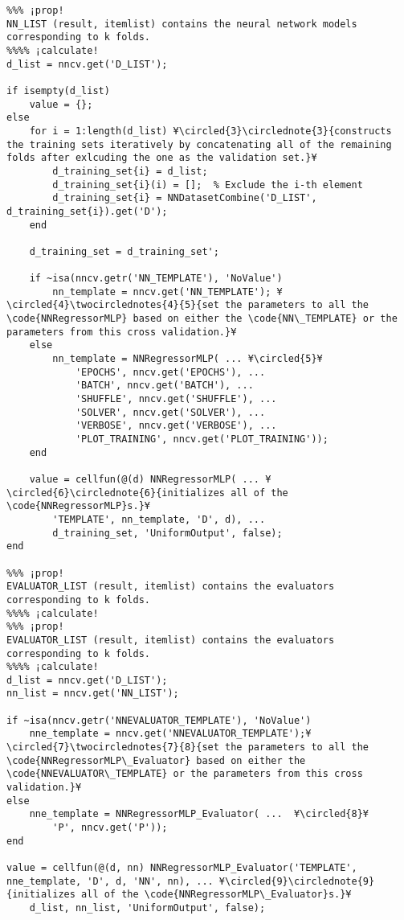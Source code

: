 \documentclass{tufte-handout}
\begin{document}
\begin{lstlisting}
%%% ¡prop!
NN_LIST (result, itemlist) contains the neural network models corresponding to k folds.
%%%% ¡calculate!
d_list = nncv.get('D_LIST');

if isempty(d_list)
    value = {};
else
    for i = 1:length(d_list) ¥\circled{3}\circlednote{3}{constructs the training sets iteratively by concatenating all of the remaining folds after exlcuding the one as the validation set.}¥
        d_training_set{i} = d_list;
        d_training_set{i}(i) = [];  % Exclude the i-th element
        d_training_set{i} = NNDatasetCombine('D_LIST', d_training_set{i}).get('D');
    end

    d_training_set = d_training_set';

    if ~isa(nncv.getr('NN_TEMPLATE'), 'NoValue')
        nn_template = nncv.get('NN_TEMPLATE'); ¥\circled{4}\twocirclednotes{4}{5}{set the parameters to all the \code{NNRegressorMLP} based on either the \code{NN\_TEMPLATE} or the parameters from this cross validation.}¥
    else
        nn_template = NNRegressorMLP( ... ¥\circled{5}¥
            'EPOCHS', nncv.get('EPOCHS'), ...
            'BATCH', nncv.get('BATCH'), ...
            'SHUFFLE', nncv.get('SHUFFLE'), ...
            'SOLVER', nncv.get('SOLVER'), ...
            'VERBOSE', nncv.get('VERBOSE'), ...
            'PLOT_TRAINING', nncv.get('PLOT_TRAINING'));
    end
    
    value = cellfun(@(d) NNRegressorMLP( ... ¥\circled{6}\circlednote{6}{initializes all of the \code{NNRegressorMLP}s.}¥
        'TEMPLATE', nn_template, 'D', d), ...
        d_training_set, 'UniformOutput', false);
end

%%% ¡prop!
EVALUATOR_LIST (result, itemlist) contains the evaluators corresponding to k folds.
%%%% ¡calculate!
%%% ¡prop!
EVALUATOR_LIST (result, itemlist) contains the evaluators corresponding to k folds.
%%%% ¡calculate!
d_list = nncv.get('D_LIST');
nn_list = nncv.get('NN_LIST');

if ~isa(nncv.getr('NNEVALUATOR_TEMPLATE'), 'NoValue')
    nne_template = nncv.get('NNEVALUATOR_TEMPLATE');¥\circled{7}\twocirclednotes{7}{8}{set the parameters to all the \code{NNRegressorMLP\_Evaluator} based on either the \code{NNEVALUATOR\_TEMPLATE} or the parameters from this cross validation.}¥
else
    nne_template = NNRegressorMLP_Evaluator( ...  ¥\circled{8}¥
        'P', nncv.get('P'));
end

value = cellfun(@(d, nn) NNRegressorMLP_Evaluator('TEMPLATE', nne_template, 'D', d, 'NN', nn), ... ¥\circled{9}\circlednote{9}{initializes all of the \code{NNRegressorMLP\_Evaluator}s.}¥
    d_list, nn_list, 'UniformOutput', false);

\end{lstlisting}
\end{document}
